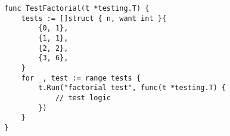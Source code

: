 \begin{lstlisting}[caption=Table-driven test,label=lst:go_table_test,float,floatplacement=H]
func TestFactorial(t *testing.T) {
    tests := []struct { n, want int }{
        {0, 1},
        {1, 1},
        {2, 2},
        {3, 6},
    }
    for _, test := range tests {
        t.Run("factorial test", func(t *testing.T) {
            // test logic
        })
    }
}
\end{lstlisting}
